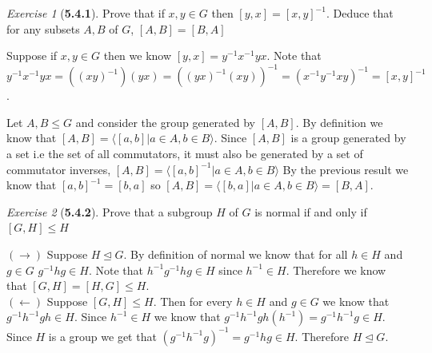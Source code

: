 \documentclass[12pt]{amsart}
\makeatletter
\theoremstyle{remark}
\newtheorem*{exercise}{Exercise}%
\renewenvironment{proof}[1][\proofname]{\par\doublespacing
  \pushQED{\qed}%
  \normalfont \topsep6\p@\@plus6\p@\relax
  \list{}{%
    \settowidth{\leftmargin}{\itshape\proofname:\hskip\labelsep}%
    \setlength{\labelwidth}{0pt}%
    \setlength{\itemindent}{-\leftmargin}%
  }%
  \item[\hskip\labelsep\itshape#1\@addpunct{:}]\ignorespaces
}{%
  \popQED\endlist\@endpefalse
  \singlespacing
}
\theoremstyle{mycomment}
\makeatother
\begin{document}
\begin{exercise}[\textbf{5.4.1}] Prove that if $x, y \in G$ then $[y, x]= [x, y]^{-1}$. Deduce that for any subsets $A, B$ of $G$, $[A, B] = [B, A]$
  \begin{proof} Suppose if $x, y \in G$ then we know $[y, x] = y^{-1}x^{-1}yx$. Note that $y^{-1}x^{-1}yx = ((xy)^{-1})(yx) = ((yx)^{-1}(xy))^{-1} = (x^{-1}y^{-1}xy)^{-1} = [x, y]^{-1}$.

    Let $A, B \leq G$ and consider the group generated by $[A, B]$. By definition we know that
    $[A, B] = \langle [a, b] | a \in A, b \in B \rangle$. Since $[A, B]$ is a group generated by a set i.e the set of all commutators, it must also be generated by a set of commutator inverses, $[A, B] = \langle [a, b]^{-1} | a \in A, b \in B \rangle$
    By the previous result we know that $[a, b]^{-1} = [b, a]$ so $[A, B] = \langle [b, a] | a \in A, b \in B \rangle = [B, A]$. 
  \end{proof}

\end{exercise}
\vspace{.15in}



\begin{exercise}[\textbf{5.4.2}] Prove that a subgroup $H$ of $G$ is normal if and only if $[G, H] \leq H$
  \begin{proof}$(\rightarrow)$ Suppose $H \trianglelefteq G$. By definition of normal we know that for all $h \in H$ and $g \in G$ $g^{-1}hg \in H$. Note that $h^{-1}g^{-1}hg \in H$ since $h^{-1} \in H$. Therefore we know that $[G, H] = [H, G] \leq H$.\\

  \noindent $(\leftarrow)$ Suppose $[G, H] \leq H$. Then for every $h \in H$ and $g \in G$ we know that 
  $g^{-1}h^{-1}gh \in H$. Since $h^{-1} \in H$ we know that $g^{-1}h^{-1}gh(h^{-1}) = g^{-1}h^{-1}g \in H$. Since $H$ is a group we get that $(g^{-1}h^{-1}g)^{-1} = g^{-1}hg \in H$. Therefore $H \trianglelefteq G$. 
  \end{proof}
\end{exercise}
\vspace{.15in}
\end{document}
